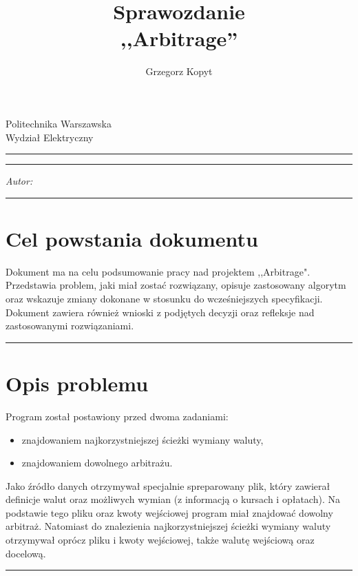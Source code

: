 \documentclass[a4paper,11pt]{article}
\author{Grzegorz Kopyt}
\title{Sprawozdanie \\
,,Arbitrage''}
\makeatletter
\newcommand{\linia}{\rule{\linewidth}{0.4mm}}
\renewcommand{\maketitle}{\begin{titlepage}
    \vspace*{2cm}
    \begin{center}\LARGE
    Politechnika Warszawska\\
    Wydział Elektryczny\\
    \end{center}
    \vspace{5cm}
    \noindent\linia
    \begin{center}
      \LARGE \textsc{\@title}
         \end{center}
     \linia
    \vspace{0.5cm}
    \begin{flushright}
    \begin{minipage}{5cm}
    \textit{Autor:}\\
    \normalsize \textsc{\@author} \par
    \end{minipage}
    \vspace{5cm}
     \end{flushright}
    \vspace*{\stretch{6}}
    \begin{center}
    \@date
    \end{center}
  \end{titlepage}
}
\makeatother
\begin{document}
\maketitle

\tableofcontents
\vspace{1cm}
\noindent\linia
\section{Cel powstania dokumentu}
Dokument ma na celu podsumowanie pracy nad projektem ,,Arbitrage". Przedstawia problem, jaki miał zostać rozwiązany, opisuje zastosowany algorytm oraz wskazuje zmiany dokonane w stosunku do wcześniejszych specyfikacji. Dokument zawiera również wnioski z podjętych decyzji oraz refleksje nad zastosowanymi rozwiązaniami.

\noindent\linia
\section{Opis problemu}
Program został postawiony przed dwoma zadaniami:
\begin{itemize}
\item znajdowaniem najkorzystniejszej ścieżki wymiany waluty,
\item znajdowaniem dowolnego arbitrażu.
\end{itemize}

Jako źródło danych otrzymywał specjalnie spreparowany plik, który zawierał definicje walut oraz możliwych wymian (z informacją  o kursach i opłatach).
Na podstawie tego pliku oraz kwoty wejściowej program miał znajdować dowolny arbitraż. Natomiast do znalezienia najkorzystniejszej ścieżki wymiany waluty otrzymywał oprócz pliku i kwoty wejściowej, także walutę wejściową oraz docelową.

\noindent\linia
\end{document}
